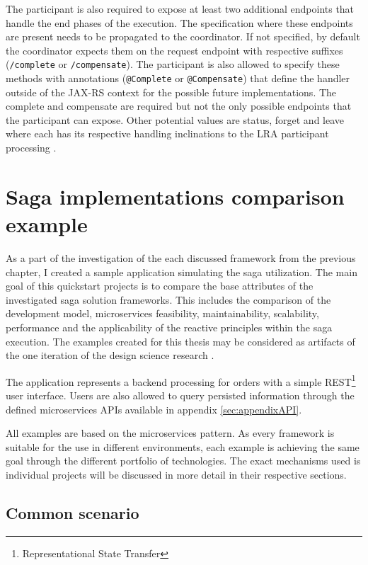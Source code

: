 \documentclass[oneside,
  digital, %
  table,   %
  nolof,     %
  nolot,     %
]{fithesis3}
\begin{document}
The participant is also required to expose at least two additional endpoints that handle the end phases of the execution. The specification where these endpoints are present needs to be propagated to the coordinator. If not specified, by default the coordinator expects them on the request endpoint with respective suffixes (\texttt{/complete} or \texttt{/compensate}). The participant is also allowed to specify these methods with annotations (\texttt{@Complete} or \texttt{@Compensate}) that define the handler outside of the JAX-RS context for the possible future implementations. The complete and compensate are required but not the only possible endpoints that the participant can expose. Other potential values are status, forget and leave where each has its respective handling inclinations to the LRA participant processing \cite{narayana_lra}.


\clearpage
\chapter{Saga implementations comparison example}

As a part of the investigation of the each discussed framework from the previous chapter, I created a sample application simulating the saga utilization. The main goal of this quickstart projects is to compare the base attributes of the investigated saga solution frameworks. This includes the comparison of the development model, microservices feasibility, maintainability, scalability, performance and the applicability of the reactive principles within the saga execution. The examples created for this thesis may be considered as artifacts of the one iteration of the design science research \cite{design_science}.

The application represents a backend processing for orders with a simple REST\footnote{Representational State Transfer} user interface. Users are also allowed to query persisted information through the defined microservices APIs available in appendix \ref{sec:appendixAPI}.

All examples are based on the microservices pattern. As every framework is suitable for the use in different environments, each example is achieving the same goal through the different portfolio of technologies. The exact mechanisms used is individual projects will be discussed in more detail in their respective sections.

\section{Common scenario}
\end{document}
